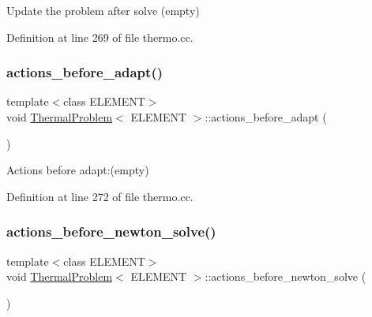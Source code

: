 Update the problem after solve (empty) 



Definition at line 269 of file thermo.\+cc.

\mbox{\label{classThermalProblem_a40bda0a4d45851f7e45dc461107d7c0f}} 
\subsubsection{\texorpdfstring{actions\+\_\+before\+\_\+adapt()}{actions\_before\_adapt()}}
{\footnotesize\ttfamily template$<$class E\+L\+E\+M\+E\+NT$>$ \\
void \hyperlink{classThermalProblem}{Thermal\+Problem}$<$ E\+L\+E\+M\+E\+NT $>$\+::actions\+\_\+before\+\_\+adapt (\begin{DoxyParamCaption}{ }\end{DoxyParamCaption})\hspace{0.3cm}{\ttfamily [inline]}}



Actions before adapt\+:(empty) 



Definition at line 272 of file thermo.\+cc.

\mbox{\label{classThermalProblem_ab2d2efaf155756144c9796b76af3ee8d}} 
\subsubsection{\texorpdfstring{actions\+\_\+before\+\_\+newton\+\_\+solve()}{actions\_before\_newton\_solve()}}
{\footnotesize\ttfamily template$<$class E\+L\+E\+M\+E\+NT$>$ \\
void \hyperlink{classThermalProblem}{Thermal\+Problem}$<$ E\+L\+E\+M\+E\+NT $>$\+::actions\+\_\+before\+\_\+newton\+\_\+solve (\begin{DoxyParamCaption}{ }\end{DoxyParamCaption})\hspace{0.3cm}{\ttfamily [inline]}}



